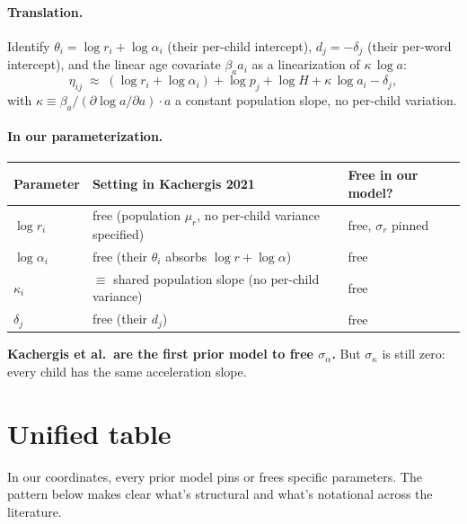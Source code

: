 \documentclass[11pt]{article}
\begin{document}
\paragraph{Translation.}
Identify $\theta_i = \log r_i + \log\alpha_i$ (their per-child
intercept), $d_j = -\delta_j$ (their per-word intercept), and the
linear age covariate $\beta_a a_i$ as a linearization of
$\kappa\,\log a$:
\begin{equation}
\eta_{ij} \;\approx\;
(\log r_i + \log\alpha_i) + \log p_j + \log H + \kappa\,\log a_i - \delta_j,
\end{equation}
with $\kappa \equiv \beta_a/(\partial \log a /\partial a) \cdot a$ a
constant population slope, no per-child variation.

\paragraph{In our parameterization.}

\begin{center}
\renewcommand{\arraystretch}{1.10}
\begin{tabular}{@{}lll@{}}
\toprule
\textbf{Parameter} & \textbf{Setting in Kachergis 2021} & \textbf{Free in our model?} \\
\midrule
$\log r_i$         & free (population $\mu_r$, no per-child variance specified) & free, $\sigma_r$ pinned \\
$\log \alpha_i$    & free (their $\theta_i$ absorbs $\log r + \log \alpha$) & free \\
$\kappa_i$         & $\equiv$ shared population slope (no per-child variance) & free \\
$\delta_j$         & free (their $d_j$)                  & free \\
\bottomrule
\end{tabular}
\end{center}

\textbf{Kachergis et al.\ are the first prior model to free $\sigma_\alpha$.}
But $\sigma_\kappa$ is still zero: every child has the same
acceleration slope.

\section{Unified table}

In our coordinates, every prior model pins or frees specific parameters.
The pattern below makes clear what's structural and what's notational
across the literature.
\end{document}
